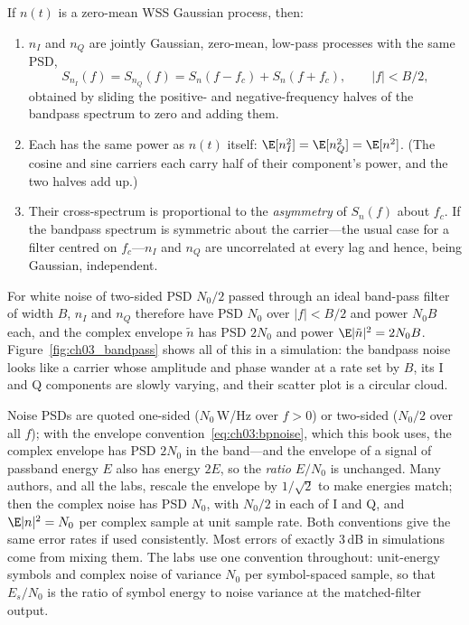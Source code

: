 If $n(t)$ is a zero-mean WSS Gaussian process, then:
\begin{enumerate}
\item $n_I$ and $n_Q$ are jointly Gaussian, zero-mean, low-pass processes with the same PSD,
\begin{equation}
S_{n_I}(f)=S_{n_Q}(f)=S_n(f-f_c)+S_n(f+f_c),\qquad |f|<B/2,
\end{equation}
obtained by sliding the positive- and negative-frequency halves of the bandpass spectrum to zero and
adding them.
\item Each has the same power as $n(t)$ itself: $\E[n_I^2]=\E[n_Q^2]=\E[n^2]$. (The cosine and sine
carriers each carry half of their component's power, and the two halves add up.)
\item Their cross-spectrum is proportional to the \emph{asymmetry} of $S_n(f)$ about $f_c$. If the
bandpass spectrum is symmetric about the carrier---the usual case for a filter centred on
$f_c$---$n_I$ and $n_Q$ are uncorrelated at every lag and hence, being Gaussian, independent.
\end{enumerate}
For white noise of two-sided PSD $N_0/2$ passed through an ideal band-pass filter of width $B$, $n_I$
and $n_Q$ therefore have PSD $N_0$ over $|f|<B/2$ and power $N_0B$ each, and the complex envelope
$\tilde n$ has PSD $2N_0$ and power $\E|\tilde n|^2=2N_0B$. Figure~\ref{fig:ch03_bandpass} shows all
of this in a simulation: the bandpass noise looks like a carrier whose amplitude and phase wander at a
rate set by $B$, its I and Q components are slowly varying, and their scatter plot is a circular cloud.


\begin{pitfall}
Noise PSDs are quoted one-sided ($N_0$\,W/Hz over $f>0$) or two-sided ($N_0/2$ over all $f$); with the
envelope convention~\eqref{eq:ch03:bpnoise}, which this book uses, the complex envelope has PSD $2N_0$
in the band---and the envelope of a signal of passband energy $E$ also has energy $2E$, so the
\emph{ratio} $E/N_0$ is unchanged. Many authors, and all the labs, rescale the envelope by $1/\sqrt2$
to make energies match; then the complex noise has PSD $N_0$, with $N_0/2$ in each of I and Q, and
$\E|n|^2=N_0$ per complex sample at unit sample rate. Both conventions give the same error rates if
used consistently. Most errors of exactly 3\,dB in simulations come from mixing them. The labs use one
convention throughout: unit-energy symbols and complex noise of variance $N_0$ per symbol-spaced
sample, so that $E_s/N_0$ is the ratio of symbol energy to noise variance at the matched-filter
output.
\end{pitfall}

